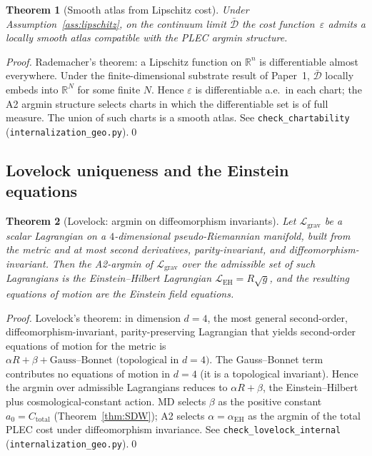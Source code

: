 \documentclass[11pt,a4paper]{article}
\newtheorem{theorem}{Theorem}[section]
\theoremstyle{definition}
\newcommand{\eps}{\varepsilon}
\newcommand{\Ctot}{C_{\mathrm{total}}}
\newcommand{\coderef}[2]{\texttt{#1}\,(\texttt{#2})}
\begin{document}
\begin{theorem}[Smooth atlas from Lipschitz cost]
\label{thm:chart}
Under Assumption~\ref{ass:lipschitz}, on the continuum limit $\bar{\mathcal{D}}$ the cost function~$\eps$ admits a locally smooth atlas compatible with the PLEC argmin structure.
\end{theorem}

\begin{proof}
Rademacher's theorem: a Lipschitz function on $\mathbb{R}^n$ is differentiable almost everywhere.  Under the finite-dimensional substrate result of Paper~1, $\bar{\mathcal{D}}$ locally embeds into $\mathbb{R}^N$ for some finite $N$.  Hence $\eps$ is differentiable a.e.\ in each chart; the A2 argmin structure selects charts in which the differentiable set is of full measure.  The union of such charts is a smooth atlas.  See \coderef{check\_chartability}{internalization\_geo.py}.\qed
\end{proof}

\subsection{Lovelock uniqueness and the Einstein equations}

\begin{theorem}[Lovelock: argmin on diffeomorphism invariants]
\label{thm:lovelock}
Let $\mathcal{L}_{\mathrm{grav}}$ be a scalar Lagrangian on a $4$-dimensional pseudo-Riemannian manifold, built from the metric and at most second derivatives, parity-invariant, and diffeomorphism-invariant.  Then the A2-argmin of $\mathcal{L}_{\mathrm{grav}}$ over the admissible set of such Lagrangians is the Einstein--Hilbert Lagrangian $\mathcal{L}_{\mathrm{EH}}=R\sqrt{g}$, and the resulting equations of motion are the Einstein field equations.
\end{theorem}

\begin{proof}
Lovelock's theorem: in dimension $d=4$, the most general second-order, diffeomorphism-invariant, parity-preserving Lagrangian that yields second-order equations of motion for the metric is $\alpha R + \beta + \text{Gauss--Bonnet (topological in }d=4\text{)}$.  The Gauss--Bonnet term contributes no equations of motion in $d=4$ (it is a topological invariant).  Hence the argmin over admissible Lagrangians reduces to $\alpha R+\beta$, the Einstein--Hilbert plus cosmological-constant action.  MD selects $\beta$ as the positive constant $a_0=\Ctot$ (Theorem~\ref{thm:SDW}); A2 selects $\alpha=\alpha_{\mathrm{EH}}$ as the argmin of the total PLEC cost under diffeomorphism invariance.  See \coderef{check\_lovelock\_internal}{internalization\_geo.py}.\qed
\end{proof}
\end{document}
